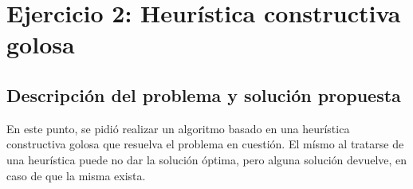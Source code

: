 \section{Ejercicio 2: Heurística constructiva golosa}


    \subsection{Descripción del problema y solución propuesta}
        En este punto, se pidió realizar un algoritmo basado en una heurística constructiva golosa que resuelva el problema en cuestión. El mísmo al tratarse de una heurística puede no dar la solución óptima, pero alguna solución devuelve, en caso de que la misma exista.

